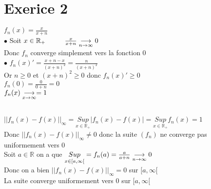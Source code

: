 \documentclass{article}
\author{Frederic Becerril}
\newcommand\tab[1][1cm]{\hspace*{#1}}
\newcommand{\mysupp}[1]{\underset{x \in #1}{Sup}}
\begin{document}
\part*{Exerice 2}

$f_n(x) = \frac{x}{x + n}$\\
$\bullet$ Soit $x \in \mathbb{R}_+ \tab \frac{x}{x+n}\mylim 0$\\
Donc $f_n$ converge simplement vers la fonction $0$\\
$\bullet$ $f_n(x)' = \frac{x + n - x}{(x + n)^2} = \frac{n}{(x+n)^2}$\\
Or $n \geq 0$ et $(x + n)^2 \geq 0$ donc $f_n(x)' \geq 0$\\
$f_n(0) = \frac{0}{0 + n} = 0$\\
$f_n(x) \mylim[x][\infty] = 1$
\\

\\
$||f_n(x) - f(x)||_{\infty} = \underset{x\in\mathbb{R}_+}{Sup} |f_n(x) - f(x)| = \mysupp{\mathbb{R_+}} f_n(x) = 1$\\
Donc $||f_n(x) - f(x)||_{\infty} \neq 0$ donc la suite $(f_n)$ ne converge pas uniformement vers 0\\
Soit $a \in \mathbb{R}$ on a que $\mysupp{[a, \infty[} = f_n(a) = \frac{a}{a + n} \mylim 0$\\
Donc on a bien $||f_n(x) - f(x)||_{\infty} = 0$ sur $[a, \infty[$\\
La suite converge uniformement vers 0 sur $[a, \infty[$
\end{document}
